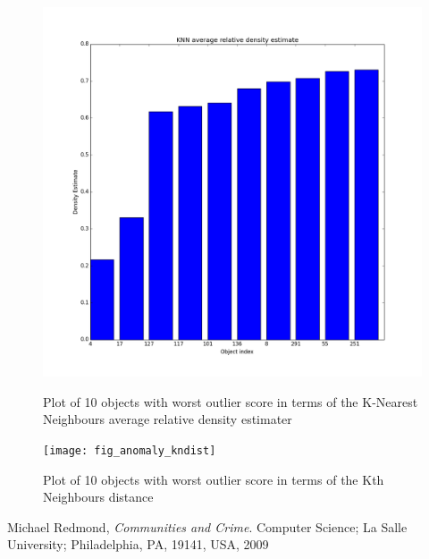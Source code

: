 \documentclass[a4paper]{article}
\begin{document}
\begin{figure}[H]
\centering
\begin{minipage}{.45\textwidth}
  \centering
  \includegraphics[width=0.9\linewidth]{fig_anomaly_knn_avgrel_de}
  \caption{Plot of 10 objects with worst outlier score in terms of the K-Nearest Neighbours average relative density estimater}
  \label{fig_anom_knn_avgrel}
\end{minipage}\hfill
\begin{minipage}{.45\textwidth}
  \centering
  \texttt{[image: fig\_anomaly\_kndist]}
  \caption{Plot of 10 objects with worst outlier score in terms of the Kth Neighbours distance}
  \label{fig_anom_kndist}
\end{minipage}
\end{figure}


\begin{thebibliography}{9}

  Michael Redmond,
  \emph{Communities and Crime}.
  Computer Science; La Salle University; Philadelphia, PA, 19141, USA,
  2009

\end{thebibliography}
\end{document}
